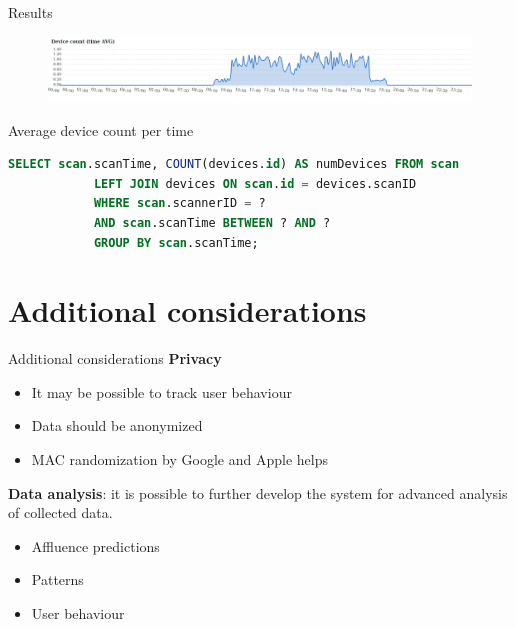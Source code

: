 \documentclass{beamer}
\begin{document}
\begin{frame}[fragile]{Results}
	\begin{figure}
		\centering
		\includegraphics[width=1\textwidth]{images/reyw2zjfg.png}
	\end{figure}
	\begin{block}
		{Average device count per time}
		\begin{lstlisting}[language=SQL]
			SELECT scan.scanTime, COUNT(devices.id) AS numDevices FROM scan
			LEFT JOIN devices ON scan.id = devices.scanID
			WHERE scan.scannerID = ?
			AND scan.scanTime BETWEEN ? AND ?
			GROUP BY scan.scanTime;
		\end{lstlisting}
	\end{block}
\end{frame}

\section{Additional considerations}
\begin{frame}{Additional considerations}
	\textbf{Privacy}
	\begin{itemize}
		\item It may be possible to track user behaviour
		\item Data should be anonymized
		\item MAC randomization by Google and Apple helps
	\end{itemize}
	\vspace{.5em}
	\textbf{Data analysis}: it is possible to further develop the system for advanced analysis of collected data.
	\begin{itemize}
		\item Affluence predictions
		\item Patterns
		\item User behaviour
	\end{itemize}
\end{frame}
\end{document}
